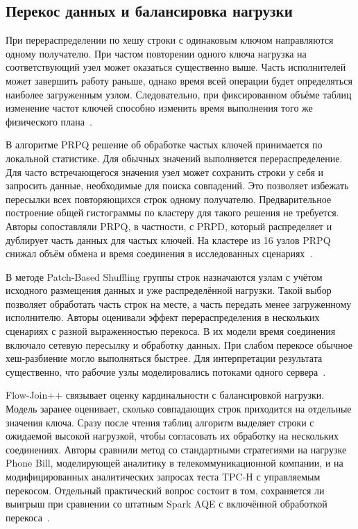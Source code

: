 \documentclass[a4paper, final]{article}
\begin{document}
	\subsection{Перекос данных и балансировка нагрузки}
	
	При перераспределении по хешу строки с одинаковым ключом направляются одному получателю. При частом повторении одного ключа нагрузка на соответствующий узел может оказаться существенно выше. Часть исполнителей может завершить работу раньше, однако время всей операции будет определяться наиболее загруженным узлом. Следовательно, при фиксированном объёме таблиц изменение частот ключей способно изменить время выполнения того же физического плана~\cite{prpq2017,flowjoin2026}.
	
	В алгоритме PRPQ решение об обработке частых ключей принимается по локальной статистике. Для обычных значений выполняется перераспределение. Для часто встречающегося значения узел может сохранить строки у себя и запросить данные, необходимые для поиска совпадений. Это позволяет избежать пересылки всех повторяющихся строк одному получателю. Предварительное построение общей гистограммы по кластеру для такого решения не требуется. Авторы сопоставляли PRPQ, в частности, с PRPD, который распределяет и дублирует часть данных для частых ключей. На кластере из 16 узлов PRPQ снижал объём обмена и время соединения в исследованных сценариях~\cite{prpq2017}.
	
	В методе Patch-Based Shuffling группы строк назначаются узлам с учётом исходного размещения данных и уже распределённой нагрузки. Такой выбор позволяет обработать часть строк на месте, а часть передать менее загруженному исполнителю. Авторы оценивали эффект перераспределения в нескольких сценариях с разной выраженностью перекоса. В их модели время соединения включало сетевую пересылку и обработку данных. При слабом перекосе обычное хеш-разбиение могло выполняться быстрее. Для интерпретации результата существенно, что рабочие узлы моделировались потоками одного сервера~\cite{kassela2025}.
	
	Flow-Join++ связывает оценку кардинальности с балансировкой нагрузки. Модель заранее оценивает, сколько совпадающих строк приходится на отдельные значения ключа. Сразу после чтения таблиц алгоритм выделяет строки с ожидаемой высокой нагрузкой, чтобы согласовать их обработку на нескольких соединениях. Авторы сравнили метод со стандартными стратегиями на нагрузке Phone Bill, моделирующей аналитику в телекоммуникационной компании, и на модифицированных аналитических запросах теста TPC-H с управляемым перекосом. Отдельный практический вопрос состоит в том, сохраняется ли выигрыш при сравнении со штатным Spark AQE с включённой обработкой перекоса~\cite{flowjoin2026}.
	
\end{document}
